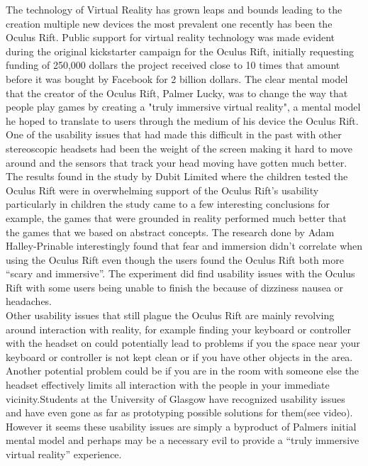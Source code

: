 \documentclass[a4paper]{article}
\begin{document}
\indent \indent The technology of Virtual Reality has grown leaps and bounds leading to the creation multiple new devices the most prevalent one recently has been the Oculus Rift. Public support for virtual reality technology was made evident during the original kickstarter campaign for the Oculus Rift, initially requesting funding of 250,000 dollars the project received close to 10 times that amount before it was bought by Facebook for 2 billion dollars. The clear mental model that the creator of the Oculus Rift, Palmer Lucky, was to change the way that people play games by creating a "truly immersive virtual reality"\cite{3}, a mental model he hoped to translate to users through the medium of his device the Oculus Rift. One of the usability issues that had made this difficult in the past with other stereoscopic headsets had been the weight of the screen making it hard to move around and the sensors that track your head moving have gotten much better. The results found in the study by Dubit Limited where the children tested the Oculus Rift were in overwhelming support of the Oculus Rift’s usability particularly in children the study came to a few interesting conclusions for example, the games that were grounded in reality performed much better that the games that we based on abstract concepts. The research done by Adam Halley-Prinable interestingly found that fear and immersion didn’t correlate when using the Oculus Rift even though the users found the Oculus Rift both more “scary and immersive”\cite{7}. The experiment did find usability issues with the Oculus Rift with some users being unable to finish the because of dizziness nausea or  headaches.\\
\indent Other usability issues that still plague the Oculus Rift are mainly revolving around interaction with reality, for example finding your keyboard or controller with the headset on could potentially lead to problems if you the space near your keyboard or controller is not kept clean or if you have other objects in the area. Another potential problem could be if you are in the room with someone else the headset effectively limits all interaction with the people in your immediate vicinity.Students at the University of Glasgow have recognized usability issues and have even gone as far as prototyping possible solutions for them(see video\cite{5}). However it seems these usability issues are simply a byproduct of Palmers initial mental model and perhaps may be a necessary evil to provide a “truly immersive virtual reality” experience\cite{3}.\\ 
\end{document}

